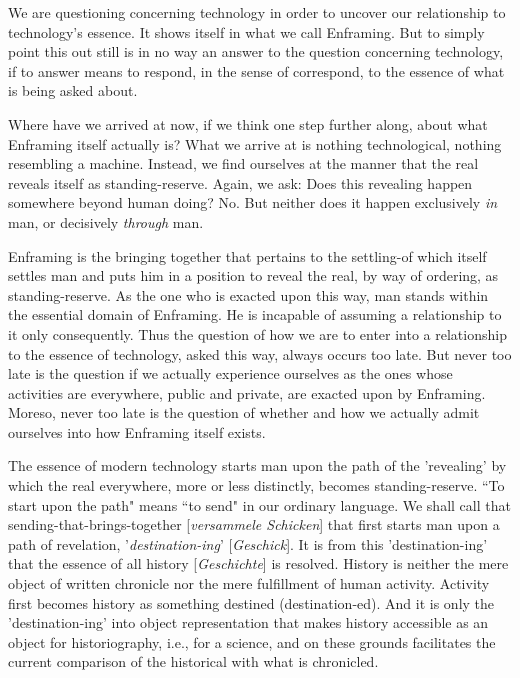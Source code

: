 We are questioning concerning technology in order to uncover our relationship to technology's essence. It shows itself in what we call Enframing. But to simply point this out still is in no way an answer to the question concerning technology, if to answer means to respond, in the sense of correspond, to the essence of what is being asked about.

Where have we arrived at now, if we think one step further along, about what Enframing itself actually is? What we arrive at is nothing technological, nothing resembling a machine. Instead, we find ourselves at the manner that the real reveals itself as standing-reserve. Again, we ask: Does this revealing happen somewhere beyond human doing? No. But neither does it happen exclusively \textit{in} man, or decisively \textit{through} man.

Enframing is the bringing together that pertains to the settling-of which itself settles man and puts him in a position to reveal the real, by way of ordering, as standing-reserve. As the one who is exacted upon this way, man stands within the essential domain of Enframing. He is incapable of assuming a relationship to it only consequently. Thus the question of how we are to enter into a relationship to the essence of technology, asked this way, always occurs too late. But never too late is the question if we actually experience ourselves as the ones whose activities are everywhere, public and private, are exacted upon by Enframing. Moreso, never too late is the question of whether and how we actually admit ourselves into how Enframing itself exists.

The essence of modern technology starts man upon the path of the 'revealing' by which the real everywhere, more or less distinctly, becomes standing-reserve. ``To start upon the path" means ``to send" in our ordinary language. We shall call that sending-that-brings-together [\textit{versammele Schicken}] that first starts man upon a path of revelation, '\textit{destination-ing}' [\textit{Geschick}]. It is from this 'destination-ing' that the essence of all history [\textit{Geschichte}] is resolved. History is neither the mere object of written chronicle nor the mere fulfillment of human activity. Activity first becomes history as something destined (destination-ed). And it is only the 'destination-ing' into object representation that makes history accessible as an object for historiography, i.e., for a science, and on these grounds facilitates the current comparison of the historical with what is chronicled.

